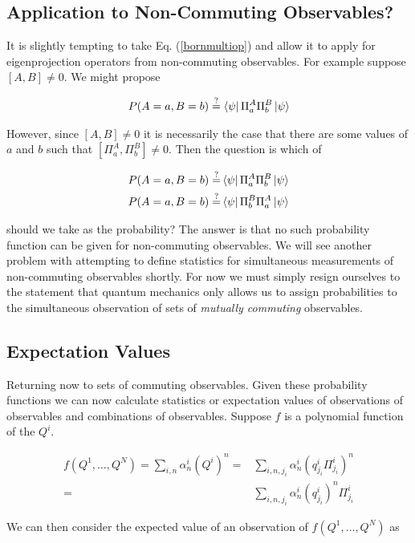 \documentclass[12pt]{article}
\begin{document}
\subsection{Application to Non-Commuting Observables?}
It is slightly tempting to take Eq. (\ref{bornmultiop}) and allow it to apply for eigenprojection operators from non-commuting observables. 
For example suppose $[A,B]\neq 0$.
We might propose

\begin{align}
P(A=a, B=b) \overset{?}{=} \bra{\psi}\Pi^A_a\Pi^B_b\ket{\psi}
\end{align}

However, since $[A,B]\neq 0$ it is necessarily the case that there are some values of $a$ and $b$ such that $[\Pi^A_a, \Pi^B_b] \neq 0$.
Then the question is which of 


\begin{align}
P(A=a, B=b) \overset{?}{=}& \bra{\psi}\Pi^A_a\Pi^B_b\ket{\psi} \nonumber\\
P(A=a, B=b) \overset{?}{=}& \bra{\psi}\Pi^B_b\Pi^A_a\ket{\psi}
\end{align}

should we take as the probability?
The answer is that no such probability function can be given for non-commuting observables.
We will see another problem with attempting to define statistics for simultaneous measurements of non-commuting observables shortly.
For now we must simply resign ourselves to the statement that quantum mechanics only allows us to assign probabilities to the simultaneous observation of sets of \textit{mutually commuting} observables.

\subsection{Expectation Values}

Returning now to sets of commuting observables.
Given these probability functions we can now calculate statistics or expectation values of observations of observables and combinations of observables. 
Suppose $f$ is a polynomial function of the $Q^i$.

\begin{align}
f(Q^1, \ldots, Q^N) = \sum_{i,n} \alpha^i_n (Q^i)^n =& \sum_{i,n, j_i} \alpha^i_n (q^i_{j_i}\Pi^i_{j_i})^n \nonumber\\
=& \sum_{i, n, j_i} \alpha^i_n (q^i_{j_i})^n \Pi^i_{j_i}
\end{align}

We can then consider the expected value of an observation of $f(Q^1, \ldots, Q^N)$ as
\end{document}
